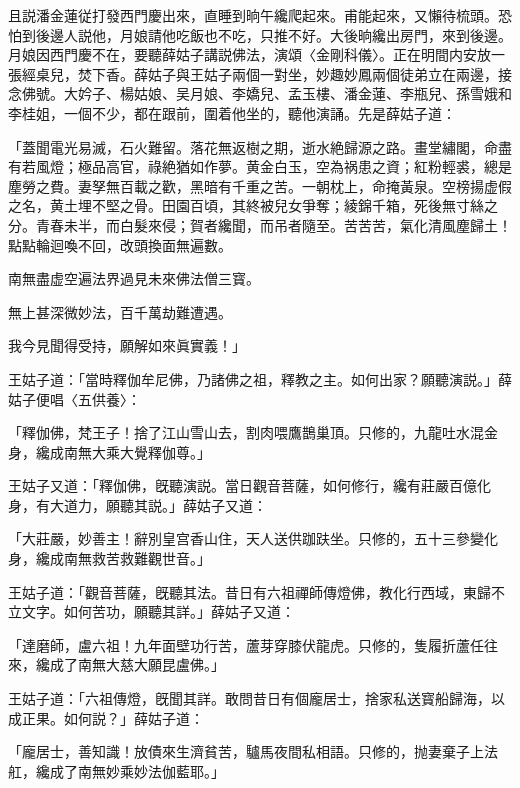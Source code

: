 且説潘金蓮従打發西門慶出來，直睡到晌午纔爬起來。甫能起來，又懶待梳頭。恐怕到後邊人説他，月娘請他吃飯也不吃，只推不好。大後晌纔出房門，來到後邊。月娘因西門慶不在，要聽薛姑子講説佛法，演頌〈金剛科儀〉。正在明間内安放一張經桌兒，焚下香。薛姑子與王姑子兩個一對坐，妙趣妙鳳兩個徒弟立在兩邊，接念佛號。大妗子、楊姑娘、吴月娘、李嬌兒、孟玉樓、潘金蓮、李瓶兒、孫雪娥和李桂姐，一個不少，都在跟前，圍着他坐的，聽他演誦。先是薛姑子道：

\begin{myquote}
「蓋聞電光易滅，石火難留。落花無返樹之期，逝水絶歸源之路。畫堂繡閣，命盡有若風燈；極品高官，祿絶猶如作夢。黄金白玉，空為祸患之資；紅粉輕裘，總是塵勞之費。妻孥無百載之歡，黑暗有千重之苦。一朝枕上，命掩黃泉。空榜揚虚假之名，黄土埋不堅之骨。田園百頃，其終被兒女爭奪；綾錦千箱，死後無寸絲之分。青春未半，而白髮來侵；賀者纔聞，而吊者隨至。苦苦苦，氣化清風塵歸土！點點輪迴喚不回，改頭換面無遍數。

南無盡虚空遍法界過見未來佛法僧三寳。

無上甚深微妙法，百千萬劫難遭遇。

我今見聞得受持，願解如來眞實義！」
\end{myquote}

王姑子道：「當時釋伽牟尼佛，乃諸佛之祖，釋教之主。如何出家？願聽演説。」薛姑子便唱〈五供養〉：

\begin{myquote}
「釋伽佛，梵王子！捨了江山雪山去，割肉喂鷹鵲巢頂。只修的，九龍吐水混金身，纔成南無大乘大覺釋伽尊。」
\end{myquote}

王姑子又道：「釋伽佛，旣聽演説。當日觀音菩薩，如何修行，纔有莊嚴百億化身，有大道力，願聽其説。」薛姑子又道：

\begin{myquote}
「大莊嚴，妙善主！辭別皇宫香山住，天人送供跏趺坐。只修的，五十三參變化身，纔成南無救苦救難觀世音。」
\end{myquote}

王姑子道：「觀音菩薩，旣聽其法。昔日有六祖禪師傳燈佛，教化行西域，東歸不立文字。如何苦功，願聽其詳。」薛姑子又道：

\begin{myquote}
「達磨師，盧六祖！九年面壁功行苦，蘆芽穿膝伏龍虎。只修的，隻履折蘆任往來，纔成了南無大慈大願昆盧佛。」
\end{myquote}

王姑子道：「六祖傳燈，旣聞其詳。敢問昔日有個龐居士，捨家私送寳船歸海，以成正果。如何説？」薛姑子道：

\begin{myquote}
「龐居士，善知識！放債來生濟貧苦，驢馬夜間私相語。只修的，抛妻棄子上法舡，纔成了南無妙乘妙法伽藍耶。」
\end{myquote}

